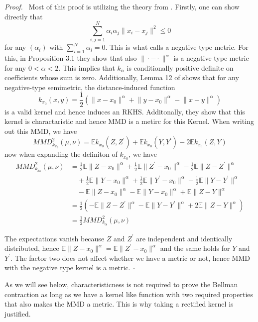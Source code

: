\documentclass[12pt]{article}
\newcommand*{\QED}{\hfill\ensuremath{\square}}
\newenvironment{proof}{\par\smallskip\noindent\textit{Proof.}\ }{\QED\par\smallskip}
\newcommand{\E}{\mathbb{E}}
\newcommand{\1}{\mathds{1}}
\newcommand{\norm}[1]{\lVert #1 \rVert}
\begin{document}
\begin{proof}
  Most of this proof is utilizing the theory from \cite{sejdinovic2013equivalence}.
  Firstly, one can show directly that 
$$\sum_{i,j=1}^{N}\alpha_i \alpha_j \|x_i-x_j\|^2 \leq 0$$
for any $(\alpha_i)$ with $\sum_{i=1}^{N}\alpha_i=0$. This is what \cite{sejdinovic2013equivalence} calls a negative type metric. 
For this, in Proposition 3.1 they show that also $\|\cdot - \cdot\|^\alpha$ is a negative type metric for any $0<\alpha<2$.
This implies that $k_\alpha$ is conditionally positive definite on coefficients whose sum is zero.
Additionally, Lemma 12 of \cite{sejdinovic2013equivalence} shows that for any
negative-type semimetric, the distance-induced function
$$
  k_{x_0}(x,y)
  =
  \frac12\left(
    \norm{x-x_0}^\alpha
    +\norm{y-x_0}^\alpha
    -\norm{x-y}^\alpha
  \right)
$$
is a valid kernel and hence induces an RKHS. Additonally, they show that this kernel is charactaristic and hence MMD is a metirc for this Kernel. 
When writing out this MMD, we have 
$$
MMD_{k_{x_0}}^2(\mu,\nu) = \E k_{x_0}(Z,Z^\prime) + \E k_{x_0}(Y,Y^\prime) - 2\E k_{x_0}(Z,Y)
$$  
now when expanding the definiton of $k_{x_0}$, we have
\begin{align*}
  MMD_{k_{x_0}}^2(\mu,\nu)
  &= \frac12\E \norm{Z-x_0}^\alpha
   + \frac12\E \norm{Z^\prime-x_0}^\alpha
   - \frac12\E \norm{Z-Z^\prime}^\alpha\\
  &\quad+ \frac12\E \norm{Y-x_0}^\alpha
   + \frac12\E \norm{Y^\prime-x_0}^\alpha
   - \frac12\E \norm{Y-Y^\prime}^\alpha\\
  &\quad-\E \norm{Z-x_0}^\alpha
   -\E \norm{Y-x_0}^\alpha
   +\E \norm{Z-Y}^\alpha\\
  &= \frac12\left(
     -\E \norm{Z-Z^\prime}^\alpha
     -\E \norm{Y-Y^\prime}^\alpha
     +2\E \norm{Z-Y}^\alpha
     \right)\\
  &= \frac12 MMD_{k_\alpha}^2(\mu,\nu)
\end{align*}

The expectations vanish because $Z$ and $Z^\prime$ are independent and identically distributed, hence $\E \norm{Z-x_0}^\alpha = \E \norm{Z^\prime-x_0}^\alpha$ and the same holds for $Y$ and $Y^\prime$.
The factor two does not affect whether we have a metric or not, hence MMD with the negative type kernel is a metric.
\end{proof} 

As we will see below, characteristicness is not required to prove the Bellman contraction
as long as we have a kernel like function with two required properties that also makes the MMD a metric. This is why taking a rectified kernel is justified. \\
\end{document}
